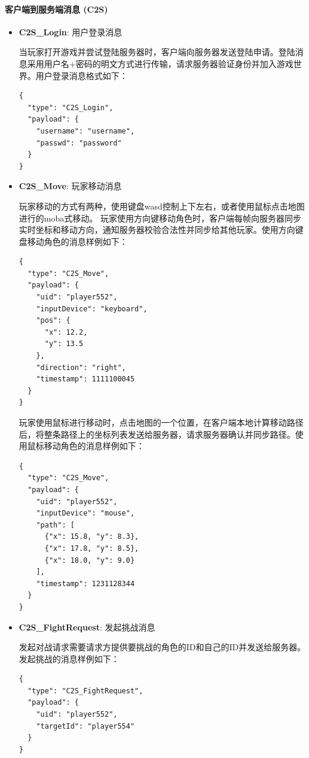\paragraph{客户端到服务端消息 (C2S)}
\begin{itemize}
    \item \textbf{C2S\_Login}: 用户登录消息
        
        当玩家打开游戏并尝试登陆服务器时，客户端向服务器发送登陆申请。登陆消息采用用户名+密码的明文方式进行传输，请求服务器验证身份并加入游戏世界。用户登录消息格式如下：
\begin{tcolorbox}[title=C2S\_Login]
\begin{verbatim}
{
  "type": "C2S_Login",
  "payload": {
    "username": "username",
    "passwd": "password"
  }
}
\end{verbatim}
\end{tcolorbox}
    \item \textbf{C2S\_Move}: 玩家移动消息 

        玩家移动的方式有两种，使用键盘wasd控制上下左右，或者使用鼠标点击地图进行的moba式移动。
        玩家使用方向键移动角色时，客户端每帧向服务器同步实时坐标和移动方向，通知服务器校验合法性并同步给其他玩家。使用方向键盘移动角色的消息样例如下：
\begin{tcolorbox}[title=C2S\_Move]
\begin{verbatim}
{
  "type": "C2S_Move",
  "payload": {
    "uid": "player552",
    "inputDevice": "keyboard",
    "pos": {
      "x": 12.2,
      "y": 13.5
    },
    "direction": "right",
    "timestamp": 1111100045
  }
}
\end{verbatim}
\end{tcolorbox}

        玩家使用鼠标进行移动时，点击地图的一个位置，在客户端本地计算移动路径后，将整条路径上的坐标列表发送给服务器，请求服务器确认并同步路径。使用鼠标移动角色的消息样例如下：
\begin{tcolorbox}[title=C2S\_Move]
\begin{verbatim}
{
  "type": "C2S_Move",
  "payload": {
  	"uid": "player552",
    "inputDevice": "mouse",
    "path": [
      {"x": 15.8, "y": 8.3},
      {"x": 17.8, "y": 8.5},
      {"x": 18.0, "y": 9.0}
    ],
    "timestamp": 1231128344
  }
}
\end{verbatim}
\end{tcolorbox}

    \item \textbf{C2S\_FightRequest}: 发起挑战消息

        发起对战请求需要请求方提供要挑战的角色的ID和自己的ID并发送给服务器。发起挑战的消息样例如下：
\begin{tcolorbox}[title=C2S\_FightRequest]
\begin{verbatim}
{
  "type": "C2S_FightRequest",
  "payload": {
    "uid": "player552",
    "targetId": "player554"
  }
}
\end{verbatim}
\end{tcolorbox}


\end{itemize}

